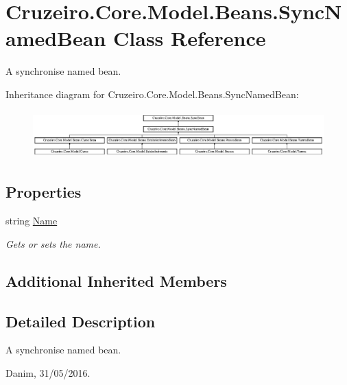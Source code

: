 \hypertarget{class_cruzeiro_1_1_core_1_1_model_1_1_beans_1_1_sync_named_bean}{}\section{Cruzeiro.\+Core.\+Model.\+Beans.\+Sync\+Named\+Bean Class Reference}
\label{class_cruzeiro_1_1_core_1_1_model_1_1_beans_1_1_sync_named_bean}


A synchronise named bean.  


Inheritance diagram for Cruzeiro.\+Core.\+Model.\+Beans.\+Sync\+Named\+Bean\+:\begin{figure}[H]
\begin{center}
\leavevmode
\includegraphics[height=1.848185cm]{class_cruzeiro_1_1_core_1_1_model_1_1_beans_1_1_sync_named_bean}
\end{center}
\end{figure}
\subsection*{Properties}
\begin{DoxyCompactItemize}
\item 
string \hyperlink{class_cruzeiro_1_1_core_1_1_model_1_1_beans_1_1_sync_named_bean_a56d72c89e04c245fc93d642a94bdb167}{Name}
\begin{DoxyCompactList}\small\item\em Gets or sets the name. \end{DoxyCompactList}\end{DoxyCompactItemize}
\subsection*{Additional Inherited Members}


\subsection{Detailed Description}
A synchronise named bean. 

Danim, 31/05/2016. 

